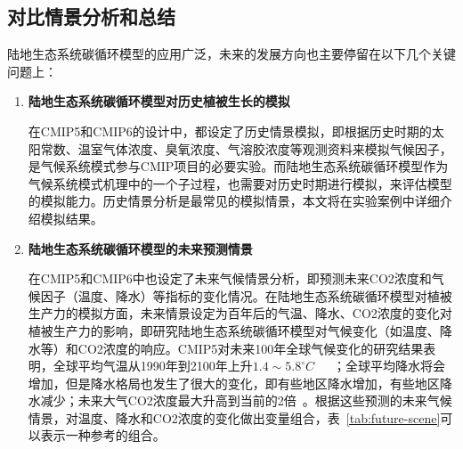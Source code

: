 \subsection{对比情景分析和总结}
\label{sec:scene}
陆地生态系统碳循环模型的应用广泛，未来的发展方向也主要停留在以下几个关键问题上：
\begin{enumerate}[(1)]
\item \textbf{陆地生态系统碳循环模型对历史植被生长的模拟}

在CMIP5和CMIP6的设计中，都设定了历史情景模拟，即根据历史时期的太阳常数、温室气体浓度、臭氧浓度、气溶胶浓度等观测资料来模拟气候因子，是气候系统模式参与CMIP项目的必要实验。而陆地生态系统碳循环模型作为气候系统模式机理中的一个子过程，也需要对历史时期进行模拟，来评估模型的模拟能力。历史情景分析是最常见的模拟情景，本文将在实验案例中详细介绍模拟结果。

\item \textbf{陆地生态系统碳循环模型的未来预测情景}

在CMIP5和CMIP6中也设定了未来气候情景分析，即预测未来CO2浓度和气候因子（温度、降水）等指标的变化情况。在陆地生态系统碳循环模型对植被生产力的模拟方面，未来情景设定为百年后的气温、降水、CO2浓度的变化对植被生产力的影响，即研究陆地生态系统碳循环模型对气候变化（如温度、降水等）和CO2浓度的响应。CMIP5对未来100年全球气候变化的研究结果表明，全球平均气温从1990年到2100年上升$1.4\sim5.8^{\circ}C$~\cite{houghton2001climate}~\cite{王绍武1995未来}~\cite{秦大河2003气候变化的事实与影响及对策}；全球平均降水将会增加，但是降水格局也发生了很大的变化，即有些地区降水增加，有些地区降水减少；未来大气CO2浓度最大升高到当前的2倍~\cite{griggs2002climate}。根据这些预测的未来气候情景，对温度、降水和CO2浓度的变化做出变量组合，表~\ref{tab:future-scene}可以表示一种参考的组合。


\end{enumerate}
